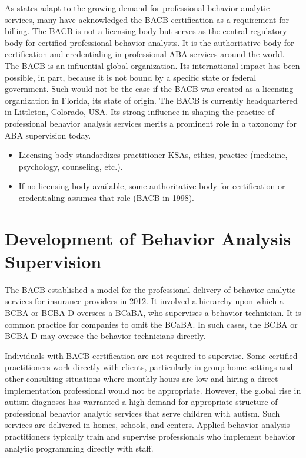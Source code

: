 As states adapt to the growing demand for professional behavior analytic services, many have acknowledged the BACB\textregistered{} certification as a requirement for billing. The BACB\textregistered{} is not a licensing body but serves as the central regulatory body for certified professional behavior analysts. It is the authoritative body for certification and credentialing in professional ABA services around the world. The BACB\textregistered{} is an influential global organization. Its international impact has been possible, in part, because it is not bound by a specific state or federal government. Such would not be the case if the BACB\textregistered{} was created as a licensing organization in Florida, its state of origin. The BACB\textregistered{} is currently headquartered in Littleton, Colorado, USA. Its strong influence in shaping the practice of professional behavior analysis services merits a prominent role in a taxonomy for ABA supervision today. 

\begin{itemize}
\item Licensing body standardizes practitioner KSAs, ethics, practice (medicine, psychology, counseling, etc.).
\item If no licensing body available, some authoritative body for certification or credentialing assumes that role (BACB in 1998).
\end{itemize}

\section{Development of Behavior Analysis Supervision}

The BACB\textregistered{} established a model for the professional delivery of behavior analytic services for insurance providers in 2012. It involved a hierarchy upon which a BCBA or BCBA-D oversees a BCaBA, who supervises a behavior technician. It is common practice for companies to omit the BCaBA. In such cases, the BCBA or BCBA-D may oversee the behavior technicians directly.

Individuals with BACB\textregistered{} certification are not required to supervise. Some certified practitioners work directly with clients, particularly in group home settings and other consulting situations where monthly hours are low and hiring a direct implementation professional would not be appropriate. However, the global rise in autism diagnoses has warranted a high demand for appropriate structure of professional behavior analytic services that serve children with autism. Such services are delivered in homes, schools, and centers. Applied behavior analysis practitioners typically train and supervise professionals who implement behavior analytic programming directly with staff. 

